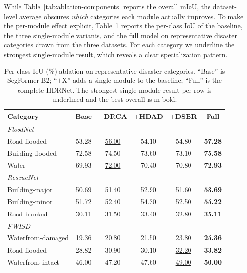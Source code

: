 \documentclass[lettersize,journal]{IEEEtran}
\begin{document}
While Table~\ref{tab:ablation-components} reports the overall mIoU, the dataset-level average obscures \emph{which} categories each module actually improves. To make the per-module effect explicit, Table~\ref{tab:ablation-perclass} reports the per-class IoU of the baseline, the three single-module variants, and the full model on representative disaster categories drawn from the three datasets. For each category we underline the strongest single-module result, which reveals a clear specialization pattern.

\begin{table}[!ht]
\caption{Per-class IoU (\%) ablation on representative disaster categories. ``Base'' is SegFormer-B2; ``$+$X'' adds a single module to the baseline; ``Full'' is the complete HDRNet. The strongest single-module result per row is underlined and the best overall is in bold.}
\label{tab:ablation-perclass}
\centering
\footnotesize
\setlength{\tabcolsep}{3.5pt}
\renewcommand{\arraystretch}{1.15}
\begin{tabular}{lccccc}
\hline
Category & Base & $+$DRCA & $+$HDAD & $+$DSBR & Full \\
\hline
\multicolumn{6}{l}{\textit{FloodNet}} \\
Road-flooded & 53.28 & \underline{56.00} & 54.10 & 54.80 & \textbf{57.28} \\
Building-flooded & 72.58 & \underline{74.50} & 73.60 & 73.10 & \textbf{75.58} \\
Water & 69.93 & \underline{72.00} & 70.40 & 70.80 & \textbf{72.93} \\
\hline
\multicolumn{6}{l}{\textit{RescueNet}} \\
Building-major & 50.69 & 51.40 & \underline{52.90} & 51.60 & \textbf{53.69} \\
Building-minor & 51.72 & 52.40 & \underline{54.30} & 52.50 & \textbf{55.22} \\
Road-blocked & 30.11 & 31.50 & \underline{33.40} & 32.80 & \textbf{35.11} \\
\hline
\multicolumn{6}{l}{\textit{FWISD}} \\
Waterfront-damaged & 19.36 & 20.80 & 21.50 & \underline{23.80} & \textbf{25.36} \\
Road-flooded & 28.82 & 30.90 & 30.10 & \underline{32.20} & \textbf{33.82} \\
Waterfront-intact & 46.00 & 47.20 & 47.60 & \underline{49.00} & \textbf{50.00} \\
\hline
\end{tabular}
\end{table}
\end{document}
